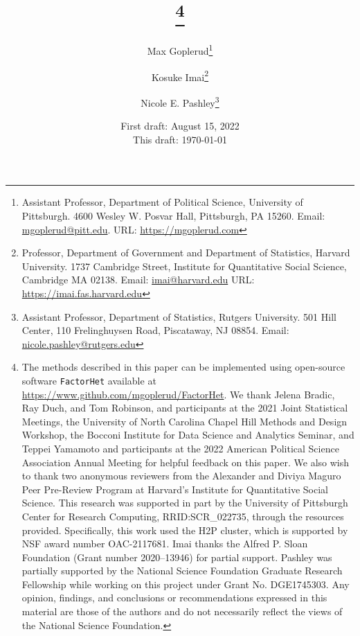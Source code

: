 

\blind

{\title{{\bf \tit}\thanks{The methods described in this paper can be
      implemented using open-source software \texttt{FactorHet}
      available at
      \url{https://www.github.com/mgoplerud/FactorHet}. We thank
      Jelena Bradic, Ray Duch, and Tom Robinson, and participants at the 2021 Joint Statistical Meetings, the University of North Carolina Chapel Hill Methods and Design Workshop, the Bocconi Institute for Data Science and Analytics Seminar, and Teppei Yamamoto and participants at the 2022 American Political Science Association Annual Meeting for helpful feedback on this paper. We also wish to thank two anonymous reviewers from the Alexander and Diviya Maguro Peer Pre-Review Program at Harvard's Institute for Quantitative Social Science. This research was supported in part by the University of Pittsburgh Center for Research Computing, RRID:SCR\_022735, through the resources provided. Specifically, this work used the H2P cluster, which is supported by NSF award number OAC-2117681. Imai thanks the Alfred P. Sloan Foundation (Grant number 2020--13946) for partial support. Pashley was partially supported by the National Science Foundation Graduate Research Fellowship while working on this project under Grant No. DGE1745303. Any opinion, findings, and conclusions or recommendations expressed in this material are those of the authors and do not necessarily reflect the views of the National Science Foundation.}}

  \author{Max Goplerud\thanks{Assistant Professor, Department of Political Science, University of Pittsburgh. 4600 Wesley W. Posvar Hall, Pittsburgh, PA 15260. Email: \href{mailto:mgoplerud@pitt.edu}{mgoplerud@pitt.edu}. URL: \href{https://www.mgoplerud.com}{https://mgoplerud.com}}
    \and
    Kosuke
    Imai\thanks{Professor, Department of Government and Department of
      Statistics, Harvard University.  1737 Cambridge Street,
      Institute for Quantitative Social Science, Cambridge MA 02138.
      Email: \href{mailto:imai@harvard.edu}{imai@harvard.edu} URL:
      \href{https://imai.fas.harvard.edu}{https://imai.fas.harvard.edu}}
    \and Nicole E. Pashley\thanks{Assistant Professor, Department of Statistics, Rutgers University.  501 Hill Center, 
    110 Frelinghuysen Road, Piscataway, NJ 08854.
      Email: \href{mailto:nicole.pashley@rutgers.edu}{nicole.pashley@rutgers.edu}}}


  \date{
       First draft: August 15, 2022 \\
    This draft: \today
}

\maketitle

}\fi



